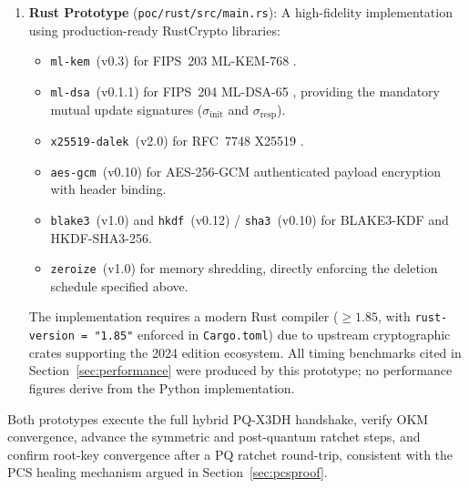 \documentclass[11pt,a4paper]{article}
\theoremstyle{remark}
\theoremstyle{plain}
\begin{document}
\begin{enumerate}
  \item \textbf{Rust Prototype} (\texttt{poc/rust/src/main.rs}): A high-fidelity implementation
        using production-ready RustCrypto libraries:
        \begin{itemize}
          \item \texttt{ml-kem}~(v0.3) for FIPS~203 ML-KEM-768 \cite{nist_fips203}.
          \item \texttt{ml-dsa}~(v0.1.1) for FIPS~204 ML-DSA-65 \cite{nist_fips204}, providing
                the mandatory mutual update signatures ($\sigma_{\mathrm{init}}$ and $\sigma_{\mathrm{resp}}$).
          \item \texttt{x25519-dalek}~(v2.0) for RFC~7748 X25519 \cite{rfc7748}.
          \item \texttt{aes-gcm}~(v0.10) for AES-256-GCM authenticated payload encryption with header binding.
          \item \texttt{blake3}~(v1.0) and \texttt{hkdf}~(v0.12) / \texttt{sha3}~(v0.10) for
                BLAKE3-KDF and HKDF-SHA3-256.
          \item \texttt{zeroize}~(v1.0) for memory shredding, directly enforcing the deletion
                schedule specified above.
        \end{itemize}
        The implementation requires a modern Rust compiler ($\ge 1.85$, with \texttt{rust-version = "1.85"}
        enforced in \texttt{Cargo.toml}) due to upstream cryptographic crates supporting the 2024 edition ecosystem.
        All timing benchmarks cited in Section~\ref{sec:performance} were produced by this prototype;
        no performance figures derive from the Python implementation.
\end{enumerate}

Both prototypes execute the full hybrid PQ-X3DH handshake, verify OKM convergence, advance the
symmetric and post-quantum ratchet steps, and confirm root-key convergence after a PQ ratchet
round-trip, consistent with the PCS healing mechanism argued in Section~\ref{sec:pcsproof}.
\end{document}
